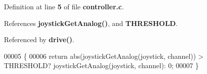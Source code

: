 Definition at line \textbf{ 5} of file \textbf{ controller.\+c}.



References \textbf{ joystick\+Get\+Analog()}, and \textbf{ T\+H\+R\+E\+S\+H\+O\+LD}.



Referenced by \textbf{ drive()}.


\begin{DoxyCode}
00005                                                                       \{
00006   \textcolor{keywordflow}{return} abs(joystickGetAnalog(joystick, channel)) > THRESHOLD? 
      joystickGetAnalog(joystick, channel): 0;
00007 \}
\end{DoxyCode}
